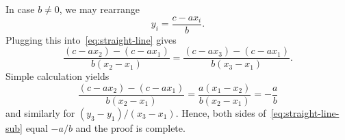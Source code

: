 In case $b \neq 0$, we may rearrange
\[
 y_i = \frac{c - ax_i}{b}.
\]
Plugging this into~\eqref{eq:straight-line} gives
\begin{equation}
 \label{eq:straight-line-sub}
 \frac{(c - ax_2) - (c - ax_1)}{b(x_2 - x_1)} = \frac{(c - ax_3) - (c -
 ax_1)}{b(x_3 - x_1)}.
\end{equation}
Simple calculation yields
\[
 \frac{(c - ax_2) - (c - ax_1)}{b(x_2 - x_1)} = \frac{a(x_1 - x_2)}{b(x_2 -
 x_1)} = - \frac{a}{b}
\]
and similarly for $(y_3 - y_1) / (x_3 - x_1)$. Hence, both sides
of~\eqref{eq:straight-line-sub} equal $-a / b$ and the proof is complete.



